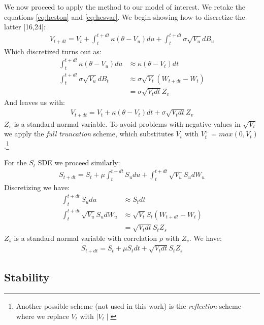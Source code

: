 \documentclass[12pt,twoside]{reedthesis}
\theoremstyle{definition}
\theoremstyle{definition}
\theoremstyle{remark}
\begin{document}
  We now proceed to apply the method to our model of interest. We retake
  the equations \eqref{eq:heston} and \eqref{eq:hesvar}. We begin showing how
  to discretize the latter {[}16,24{]}:
  \begin{align}
  \label{eq:hesvareuler}
  V_{t+dt} = V_t+ \int_{t}^{t+dt}{\kappa (\theta - V_u) du} + \int_{t}^{t+dt}{\sigma \sqrt{V_u} dB_u}
  \end{align}
  Which discretized turns out as:
  \begin{align*}
   \int_{t}^{t+dt}{\kappa (\theta - V_u)} du &\approx \kappa (\theta - V_t) dt\\
   \int_{t}^{t+dt}{\sigma \sqrt{V_u}} dB_t &\approx \sigma \sqrt{V_t} (W_{t+dt}-W_t)\\
  &= \sigma \sqrt{V_t dt} Z_v
  \end{align*}
  And leaves us with:
  \begin{align}
  V_{t+dt} = V_t + \kappa (\theta - V_t) dt + \sigma \sqrt{V_t dt} Z_v
  \end{align}
  \(Z_v\) is a standard normal variable. To avoid problems with negative
  values in \(\sqrt{V_t}\) we apply the \emph{full truncation} scheme,
  which substitutes \(V_t\) with \(V_t^+ = max(0, V_t)\).\footnote{Another
    possible scheme (not used in this work) is the \emph{reflection}
    scheme where we replace \(V_t\) with \(\mid V_t \mid\)}
  
  For the \(S_t\) SDE we proceed similarly:
  \begin{align}
  \label{eq:heseuler}
  S_{t+dt} = S_t+ \mu \int_{t}^{t+dt}{ S_u du} + \int_{t}^{t+dt}{\sqrt{V_u} S_u dW_u}
  \end{align}
  Discretizing we have:
  \begin{align*}
   \int_{t}^{t+dt}{S_u} du &\approx S_t dt\\
   \int_{t}^{t+dt}{\sqrt{V_u} S_u} dW_u &\approx \sqrt{V_t} S_t (W_{t+dt}-W_t)\\
  &= \sqrt{V_t dt} S_t Z_s
  \end{align*}
  \(Z_s\) is a standard normal variable with correlation \(\rho\) with
  \(Z_v\). We have:
  \begin{align}
  S_{t+dt} = S_t + \mu S_t dt + \sqrt{V_t dt} S_t Z_s
  \end{align}
  \subsection{Stability}\label{stability}
  
\end{document}
